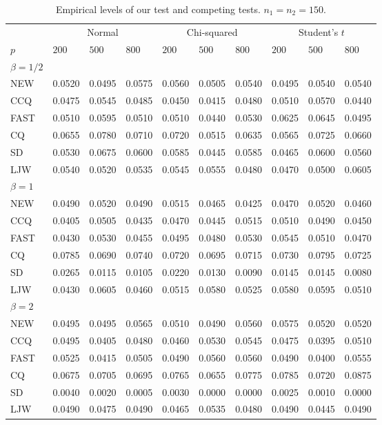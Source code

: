 \documentclass[3p]{elsarticle}
\theoremstyle{plain}
\theoremstyle{definition}
\theoremstyle{remark}
\begin{document}
\begin{table}[ht]
\caption{Empirical levels of our test and competing tests. $n_1=n_2=150$.} 
\label{hahaha3}
\vspace{3mm}
\centering
\begin{tabular}{llllllllll}
\toprule
    &   \multicolumn{3}{c}{Normal} & \multicolumn{3}{c}{Chi-squared}& \multicolumn{3}{c}{Student's $t$}  \\
    \cmidrule(r){2-4}
\cmidrule(r){5-7}
\cmidrule(r){8-10}
    $p$ & $200$ &  $500$ & $800$ & $200$  & $500$ & $800$ & $200$ & $500$ & $800$ \\ 
\midrule
    $\beta=1/2$\\
NEW & 0.0520 & 0.0495 & 0.0575 & 0.0560 & 0.0505 & 0.0540 & 0.0495 & 0.0540 & 0.0540 \\ 
CCQ & 0.0475 & 0.0545 & 0.0485 & 0.0450 & 0.0415 & 0.0480 & 0.0510 & 0.0570 & 0.0440 \\ 
FAST & 0.0510 & 0.0595 & 0.0510 & 0.0510 & 0.0440 & 0.0530 & 0.0625 & 0.0645 & 0.0495 \\ 
CQ & 0.0655 & 0.0780 & 0.0710 & 0.0720 & 0.0515 & 0.0635 & 0.0565 & 0.0725 & 0.0660 \\ 
SD & 0.0530 & 0.0675 & 0.0600 & 0.0585 & 0.0445 & 0.0585 & 0.0465 & 0.0600 & 0.0560 \\ 
LJW & 0.0540 & 0.0520 & 0.0535 & 0.0545 & 0.0555 & 0.0480 & 0.0470 & 0.0500 & 0.0605 \\ 
    $\beta=1$\\
NEW & 0.0490 & 0.0520 & 0.0490 & 0.0515 & 0.0465 & 0.0425 & 0.0470 & 0.0520 & 0.0460 \\ 
CCQ & 0.0405 & 0.0505 & 0.0435 & 0.0470 & 0.0445 & 0.0515 & 0.0510 & 0.0490 & 0.0450 \\ 
FAST & 0.0430 & 0.0530 & 0.0455 & 0.0495 & 0.0480 & 0.0530 & 0.0545 & 0.0510 & 0.0470 \\ 
CQ & 0.0785 & 0.0690 & 0.0740 & 0.0720 & 0.0695 & 0.0715 & 0.0730 & 0.0795 & 0.0725 \\ 
SD & 0.0265 & 0.0115 & 0.0105 & 0.0220 & 0.0130 & 0.0090 & 0.0145 & 0.0145 & 0.0080 \\ 
LJW & 0.0430 & 0.0605 & 0.0460 & 0.0515 & 0.0580 & 0.0525 & 0.0580 & 0.0595 & 0.0510 \\ 
    $\beta=2$\\
NEW & 0.0495 & 0.0495 & 0.0565 & 0.0510 & 0.0490 & 0.0560 & 0.0575 & 0.0520 & 0.0520 \\ 
CCQ & 0.0495 & 0.0405 & 0.0480 & 0.0460 & 0.0530 & 0.0545 & 0.0475 & 0.0395 & 0.0510 \\ 
FAST & 0.0525 & 0.0415 & 0.0505 & 0.0490 & 0.0560 & 0.0560 & 0.0490 & 0.0400 & 0.0555 \\ 
CQ & 0.0675 & 0.0705 & 0.0695 & 0.0765 & 0.0655 & 0.0775 & 0.0785 & 0.0720 & 0.0875 \\ 
SD & 0.0040 & 0.0020 & 0.0005 & 0.0030 & 0.0000 & 0.0000 & 0.0025 & 0.0010 & 0.0000 \\ 
LJW & 0.0490 & 0.0475 & 0.0490 & 0.0465 & 0.0535 & 0.0480 & 0.0490 & 0.0445 & 0.0490 \\ 
\bottomrule
\end{tabular}
\end{table}
\end{document}
